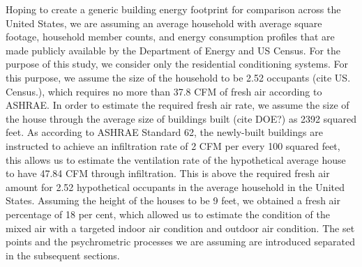 Hoping to create a generic building energy footprint for comparison across the United States, we are assuming an average household with average square footage, household member counts, and energy consumption profiles that are made publicly available by the Department of Energy and US Census. For the purpose of this study, we consider only the residential conditioning systems. For this purpose, we assume the size of the household to be 2.52 occupants (cite US. Census.), which requires no more than 37.8 CFM of fresh air according to ASHRAE. In order to estimate the required fresh air rate, we assume the size of the house through the average size of buildings built (cite DOE?) as 2392 squared feet. As according to ASHRAE Standard 62, the newly-built buildings are instructed to achieve an infiltration rate of 2 CFM per every 100 squared feet, this allows us to estimate the ventilation rate of the hypothetical average house to have 47.84 CFM through infiltration. This is above the required fresh air amount for 2.52 hypothetical occupants in the average household in the United States. Assuming the height of the houses to be 9 feet, we obtained a fresh air percentage of 18 per cent, which allowed us to estimate the condition of the mixed air with a targeted indoor air condition and outdoor air condition.  The set points and the psychrometric processes we are assuming are introduced separated in the subsequent sections.

